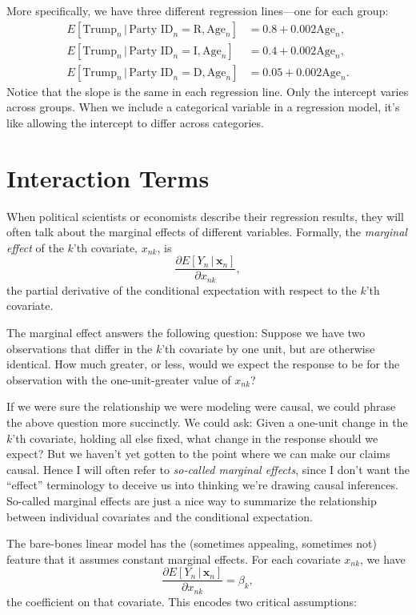 \documentclass[
  12pt,
  oneside,openany]{book}
\begin{document}
More specifically, we have three different regression lines---one for each group:
\[
\begin{aligned}
  E[\text{Trump}_n \,|\, \text{Party ID}_n = \text{R}, \text{Age}_n] &= 0.8 + 0.002 \text{Age}_n, \\
  E[\text{Trump}_n \,|\, \text{Party ID}_n = \text{I}, \text{Age}_n] &= 0.4 + 0.002 \text{Age}_n, \\
  E[\text{Trump}_n \,|\, \text{Party ID}_n = \text{D}, \text{Age}_n] &= 0.05 + 0.002 \text{Age}_n.
\end{aligned}
\]
Notice that the slope is the same in each regression line. Only the intercept varies across groups. When we include a categorical variable in a regression model, it's like allowing the intercept to differ across categories.

\hypertarget{interaction-terms}{%
\section{Interaction Terms}\label{interaction-terms}}

When political scientists or economists describe their regression results, they will often talk about the marginal effects of different variables. Formally, the \emph{marginal effect} of the \(k\)'th covariate, \(x_{nk}\), is
\[
\frac{\partial{}E[Y_n \,|\, \mathbf{x}_n]}{\partial{}x_{nk}},
\]
the partial derivative of the conditional expectation with respect to the \(k\)'th covariate.

The marginal effect answers the following question: Suppose we have two observations that differ in the \(k\)'th covariate by one unit, but are otherwise identical. How much greater, or less, would we expect the response to be for the observation with the one-unit-greater value of \(x_{nk}\)?

If we were sure the relationship we were modeling were causal, we could phrase the above question more succinctly. We could ask: Given a one-unit change in the \(k\)'th covariate, holding all else fixed, what change in the response should we expect? But we haven't yet gotten to the point where we can make our claims causal. Hence I will often refer to \emph{so-called marginal effects}, since I don't want the ``effect'' terminology to deceive us into thinking we're drawing causal inferences. So-called marginal effects are just a nice way to summarize the relationship between individual covariates and the conditional expectation.

The bare-bones linear model has the (sometimes appealing, sometimes not) feature that it assumes constant marginal effects. For each covariate \(x_{nk}\), we have
\[
\frac{\partial{}E[Y_n \,|\, \mathbf{x}_n]}{\partial{}x_{nk}} = \beta_k,
\]
the coefficient on that covariate. This encodes two critical assumptions:
\end{document}
